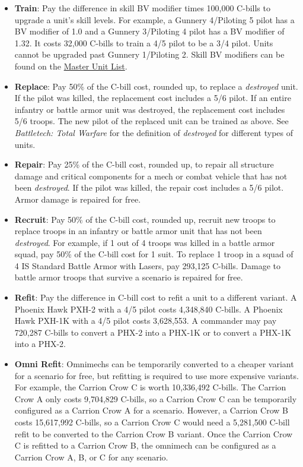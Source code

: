 \documentclass[UTF8]{article}
\begin{document}
\begin{itemize}

\item {\bf Train}: Pay the difference in skill BV modifier times 100,000 C-bills to upgrade a unit's skill levels.
For example, a Gunnery 4/Piloting 5 pilot has a BV modifier of 1.0 and a Gunnery 3/Piloting 4 pilot has a BV modifier of 1.32.
It costs 32,000 C-bills to train a 4/5 pilot to be a 3/4 pilot.
Units cannot be upgraded past Gunnery 1/Piloting 2.
Skill BV modifiers can be found on the \href{http://www.masterunitlist.info/}{Master Unit List}.

\item {\bf Replace}: Pay 50\% of the C-bill cost, rounded up, to replace a \emph{destroyed} unit.
If the pilot was killed, the replacement cost includes a 5/6 pilot.
If an entire infantry or battle armor unit was destroyed, the replacement cost includes 5/6 troops.
The new pilot of the replaced unit can be trained as above.
See \emph{Battletech: Total Warfare} for the definition of \emph{destroyed} for different types of units.

\item {\bf Repair}: Pay 25\% of the C-bill cost, rounded up, to repair all structure damage and critical components for a mech or combat vehicle that has not been \emph{destroyed}.
If the pilot was killed, the repair cost includes a 5/6 pilot.
Armor damage is repaired for free.

\item {\bf Recruit}: Pay 50\% of the C-bill cost, rounded up, recruit new troops to replace troops in an infantry or battle armor unit that has not been \emph{destroyed}.
For example, if 1 out of 4 troops was killed in a battle armor squad, pay 50\% of the C-bill cost for 1 suit.
To replace 1 troop in a squad of 4 IS Standard Battle Armor with Lasers, pay 293,125 C-bills.
Damage to battle armor troops that survive a scenario is repaired for free.

\item {\bf Refit}: Pay the difference in C-bill cost to refit a unit to a different variant.
A Phoenix Hawk PXH-2 with a 4/5 pilot costs 4,348,840 C-bills.
A Phoenix Hawk PXH-1K with a 4/5 pilot costs 3,628,553.
A commander may pay 720,287 C-bills to convert a PHX-2 into a PHX-1K or to convert a PHX-1K into a PHX-2.

\item {\bf Omni Refit}: Omnimechs can be temporarily converted to a cheaper variant for a scenario for free, but refitting is required to use more expensive variants.
For example, the Carrion Crow C is worth 10,336,492 C-bills.
The Carrion Crow A only costs 9,704,829 C-bills, so a Carrion Crow C can be temporarily configured as a Carrion Crow A for a scenario.
However, a Carrion Crow B costs 15,617,992 C-bills, so a Carrion Crow C would need a 5,281,500 C-bill refit to be converted to the Carrion Crow B variant.
Once the Carrion Crow C is refitted to a Carrion Crow B, the omnimech can be configured as a Carrion Crow A, B, or C for any scenario.


\end{itemize}
\end{document}
